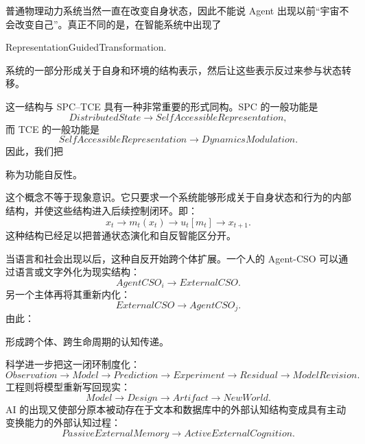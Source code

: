 普通物理动力系统当然一直在改变自身状态，因此不能说 Agent 出现以前“宇宙不会改变自己”。真正不同的是，在智能系统中出现了
\begin{statementbox}
RepresentationGuidedTransformation.
\end{statementbox}
系统的一部分形成关于自身和环境的结构表示，然后让这些表示反过来参与状态转移。

这一结构与 SPC--TCE 具有一种非常重要的形式同构。SPC 的一般功能是
\begin{equation}
DistributedState
\rightarrow
SelfAccessibleRepresentation,
\end{equation}
而 TCE 的一般功能是
\begin{equation}
SelfAccessibleRepresentation
\rightarrow
DynamicsModulation.
\end{equation}
因此，我们把
\begin{statementbox}
\centering
{}
\end{statementbox}
称为功能自反性。

这个概念不等于现象意识。它只要求一个系统能够形成关于自身状态和行为的内部结构，并使这些结构进入后续控制闭环。即：
\begin{equation}
x_t
\rightarrow
m_t(x_t)
\rightarrow
u_t[m_t]
\rightarrow
x_{t+1}.
\end{equation}
这种结构已经足以把普通状态演化和自反智能区分开。

当语言和社会出现以后，这种自反开始跨个体扩展。一个人的 Agent-CSO 可以通过语言或文字外化为现实结构：
\begin{equation}
AgentCSO_i
\rightarrow
ExternalCSO.
\end{equation}
另一个主体再将其重新内化：
\begin{equation}
ExternalCSO
\rightarrow
AgentCSO_j.
\end{equation}
由此：
\begin{statementbox}
\centering
{}
\end{statementbox}
形成跨个体、跨生命周期的认知传递。

科学进一步把这一闭环制度化：
\begin{equation}
Observation
\rightarrow
Model
\rightarrow
Prediction
\rightarrow
Experiment
\rightarrow
Residual
\rightarrow
ModelRevision.
\end{equation}
工程则将模型重新写回现实：
\begin{equation}
Model
\rightarrow
Design
\rightarrow
Artifact
\rightarrow
NewWorld.
\end{equation}
AI 的出现又使部分原本被动存在于文本和数据库中的外部认知结构变成具有主动变换能力的外部认知过程：
\begin{equation}
PassiveExternalMemory
\rightarrow
ActiveExternalCognition.
\end{equation}

